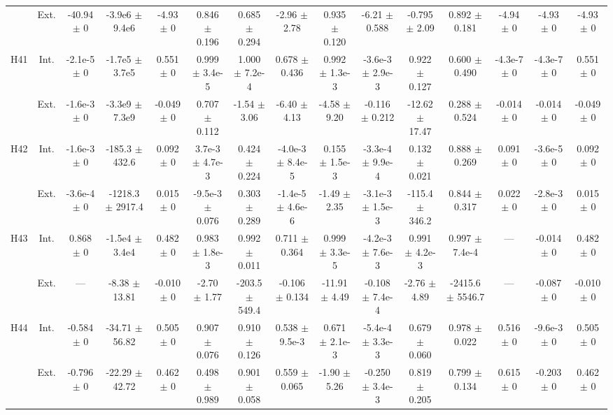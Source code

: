 \begin{table}[htbp]
{\begin{tabular}{@{}ccccccccccccccc@{}}
 & Ext. & -40.94 $\pm$ 0 & -3.9e6 $\pm$ 9.4e6 & -4.93 $\pm$ 0 & 0.846 $\pm$ 0.196 & 0.685 $\pm$ 0.294 & -2.96 $\pm$ 2.78 & 0.935 $\pm$ 0.120 & -6.21 $\pm$ 0.588 & -0.795 $\pm$ 2.09 & 0.892 $\pm$ 0.181 & -4.94 $\pm$ 0 & -4.93 $\pm$ 0 & -4.93 $\pm$ 0 \\
\cline{2-15}
\multirow{2}{*}{H41} & Int. & -2.1e-5 $\pm$ 0 & -1.7e5 $\pm$ 3.7e5 & 0.551 $\pm$ 0 & 0.999 $\pm$ 3.4e-5 & 1.000 $\pm$ 7.2e-4 & 0.678 $\pm$ 0.436 & 0.992 $\pm$ 1.3e-3 & -3.6e-3 $\pm$ 2.9e-3 & 0.922 $\pm$ 0.127 & 0.600 $\pm$ 0.490 & -4.3e-7 $\pm$ 0 & -4.3e-7 $\pm$ 0 & 0.551 $\pm$ 0 \\
 & Ext. & -1.6e-3 $\pm$ 0 & -3.3e9 $\pm$ 7.3e9 & -0.049 $\pm$ 0 & 0.707 $\pm$ 0.112 & -1.54 $\pm$ 3.06 & -6.40 $\pm$ 4.13 & -4.58 $\pm$ 9.20 & -0.116 $\pm$ 0.212 & -12.62 $\pm$ 17.47 & 0.288 $\pm$ 0.524 & -0.014 $\pm$ 0 & -0.014 $\pm$ 0 & -0.049 $\pm$ 0 \\
\cline{2-15}
\multirow{2}{*}{H42} & Int. & -1.6e-3 $\pm$ 0 & -185.3 $\pm$ 432.6 & 0.092 $\pm$ 0 & 3.7e-3 $\pm$ 4.7e-3 & 0.424 $\pm$ 0.224 & -4.0e-3 $\pm$ 8.4e-5 & 0.155 $\pm$ 1.5e-3 & -3.3e-4 $\pm$ 9.9e-4 & 0.132 $\pm$ 0.021 & 0.888 $\pm$ 0.269 & 0.091 $\pm$ 0 & -3.6e-5 $\pm$ 0 & 0.092 $\pm$ 0 \\
 & Ext. & -3.6e-4 $\pm$ 0 & -1218.3 $\pm$ 2917.4 & 0.015 $\pm$ 0 & -9.5e-3 $\pm$ 0.076 & 0.303 $\pm$ 0.289 & -1.4e-5 $\pm$ 4.6e-6 & -1.49 $\pm$ 2.35 & -3.1e-3 $\pm$ 1.5e-3 & -115.4 $\pm$ 346.2 & 0.844 $\pm$ 0.317 & 0.022 $\pm$ 0 & -2.8e-3 $\pm$ 0 & 0.015 $\pm$ 0 \\
\cline{2-15}
\multirow{2}{*}{H43} & Int. & 0.868 $\pm$ 0 & -1.5e4 $\pm$ 3.4e4 & 0.482 $\pm$ 0 & 0.983 $\pm$ 1.8e-3 & 0.992 $\pm$ 0.011 & 0.711 $\pm$ 0.364 & 0.999 $\pm$ 3.3e-5 & -4.2e-3 $\pm$ 7.6e-3 & 0.991 $\pm$ 4.2e-3 & 0.997 $\pm$ 7.4e-4 & --- & -0.014 $\pm$ 0 & 0.482 $\pm$ 0 \\
 & Ext. & --- & -8.38 $\pm$ 13.81 & -0.010 $\pm$ 0 & -2.70 $\pm$ 1.77 & -203.5 $\pm$ 549.4 & -0.106 $\pm$ 0.134 & -11.91 $\pm$ 4.49 & -0.108 $\pm$ 7.4e-4 & -2.76 $\pm$ 4.89 & -2415.6 $\pm$ 5546.7 & --- & -0.087 $\pm$ 0 & -0.010 $\pm$ 0 \\
\cline{2-15}
\multirow{2}{*}{H44} & Int. & -0.584 $\pm$ 0 & -34.71 $\pm$ 56.82 & 0.505 $\pm$ 0 & 0.907 $\pm$ 0.076 & 0.910 $\pm$ 0.126 & 0.538 $\pm$ 9.5e-3 & 0.671 $\pm$ 2.1e-3 & -5.4e-4 $\pm$ 3.3e-3 & 0.679 $\pm$ 0.060 & 0.978 $\pm$ 0.022 & 0.516 $\pm$ 0 & -9.6e-3 $\pm$ 0 & 0.505 $\pm$ 0 \\
 & Ext. & -0.796 $\pm$ 0 & -22.29 $\pm$ 42.72 & 0.462 $\pm$ 0 & 0.498 $\pm$ 0.989 & 0.901 $\pm$ 0.058 & 0.559 $\pm$ 0.065 & -1.90 $\pm$ 5.26 & -0.250 $\pm$ 3.4e-3 & 0.819 $\pm$ 0.205 & 0.799 $\pm$ 0.134 & 0.615 $\pm$ 0 & -0.203 $\pm$ 0 & 0.462 $\pm$ 0 \\

\end{tabular}}
\end{table}
